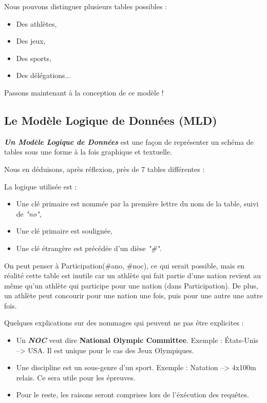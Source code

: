 \documentclass{mytex}
\begin{document}
Nous pouvons distinguer plusieurs tables possibles : 

\begin{itemize}
	\item Des athlètes,
	\item Des jeux,
	\item Des sports,
	\item Des délégations...
\end{itemize}

Passons maintenant à la conception de ce modèle !

\subsection{Le Modèle Logique de Données (MLD)}

\textbf{\emph{Un Modèle Logique de Données}} est une façon de représenter un schéma de tables sous une forme à la fois graphique et textuelle.


Nous en déduisons, après réflexion, près de 7 tables différentes : 

La logique utilisée est :

\begin{itemize}
	\item Une clé primaire est nommée par la première lettre du nom de la table, suivi de \emph{"no"},
	\item Une clé primaire est soulignée,
	\item Une clé étrangère est précédée d'un dièse \emph{"\#"}.
\end{itemize}

On peut penser à Participation(\#ano, \#noc), ce qui serait possible, mais en réalité cette table est inutile car un athlète qui fait partie d’une nation revient au même qu’un athlète qui participe pour une nation (dans Participation).
De plus, un athlète peut concourir pour une nation une fois, puis pour une autre une autre fois.

Quelques explications sur des nommages qui peuvent ne pas être explicites :

\begin{itemize}
	\item Un \textbf{\emph{NOC}} veut dire \textbf{National Olympic Committee}. Exemple : États-Unis --> USA. Il est unique pour le cas des Jeux Olympiques.
	\item Une discipline est un sous-genre d'un sport. Exemple : Natation --> 4x100m relais. Ce sera utile pour les épreuves.
	\item Pour le reste, les raisons seront comprises lors de l'éxécution des requêtes.
\end{itemize}
\end{document}
